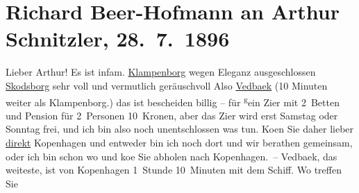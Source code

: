 

               \section[Richard Beer-Hofmann an Arthur Schnitzler, 28. 7. 1896]{ Richard Beer-Hofmann an Arthur Schnitzler, 28. 7. 1896}\nopagebreak{}\rehead{ }\begin{ledgroupsized}[t]{13cm}\normalsize\beginnumbering{} \toendnotes[C]{\smallbreak\pagebreak[2]} 
\pstart
           \noindent{}{\pb}Lieber Arthur! Es
               ist infam.\pend
           \pstart
           \uline{Klampenborg} wegen Eleganz ausgeschlossen\pend
           \pstart
           \uline{Skodsborg} sehr voll und vermutlich geräuschvoll\pend
           \pstart
           Also \uline{Vedbaek} (10 Minuten weiter als Klampenborg.)\pend
           \pstart
           das ist bescheiden billig – für \substVorne{}\textsuperscript{g}\substDazwischen{}e\substHinten{}in Zi{\geminationm}er mit 2 Betten und Pension für 2 Personen
               10 Kronen, aber das Zi{\geminationm}er wird erst {\pb}Samstag oder Sonntag frei, und ich bin also noch
               unentschlossen was tun. Ko{\geminationm}en Sie daher lieber \uline{direkt}{ }Kopenhagen und entweder bin ich noch dort und wir
               berathen gemeinsam, oder ich bin schon wo und ko{\geminationm}e Sie
               abholen nach Kopenhagen. –\pend
           \pstart
           {\pb}Vedbaek, das weiteste, ist von Kopenhagen 1 Stunde 10 Minuten mit dem Schiff. Wo treffen Sie

\end{ledgroupsized}
